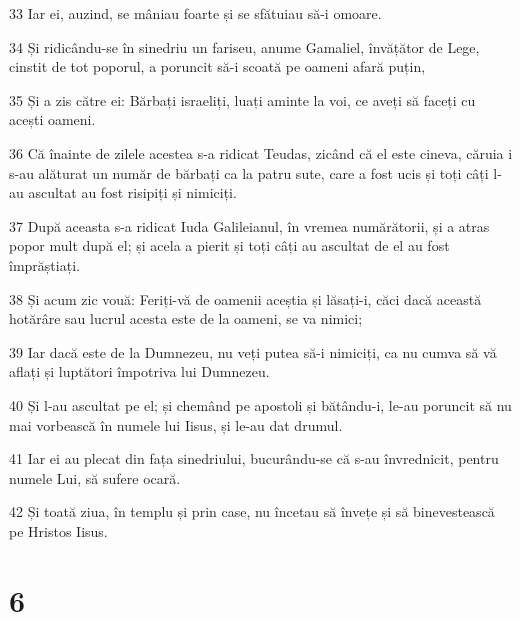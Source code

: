 \par 33 Iar ei, auzind, se mâniau foarte și se sfătuiau să-i omoare.
\par 34 Și ridicându-se în sinedriu un fariseu, anume Gamaliel, învățător de Lege, cinstit de tot poporul, a poruncit să-i scoată pe oameni afară puțin,
\par 35 Și a zis către ei: Bărbați israeliți, luați aminte la voi, ce aveți să faceți cu acești oameni.
\par 36 Că înainte de zilele acestea s-a ridicat Teudas, zicând că el este cineva, căruia i s-au alăturat un număr de bărbați ca la patru sute, care a fost ucis și toți câți l-au ascultat au fost risipiți și nimiciți.
\par 37 După aceasta s-a ridicat Iuda Galileianul, în vremea numărătorii, și a atras popor mult după el; și acela a pierit și toți câți au ascultat de el au fost împrăștiați.
\par 38 Și acum zic vouă: Feriți-vă de oamenii aceștia și lăsați-i, căci dacă această hotărâre sau lucrul acesta este de la oameni, se va nimici;
\par 39 Iar dacă este de la Dumnezeu, nu veți putea să-i nimiciți, ca nu cumva să vă aflați și luptători împotriva lui Dumnezeu.
\par 40 Și l-au ascultat pe el; și chemând pe apostoli și bătându-i, le-au poruncit să nu mai vorbească în numele lui Iisus, și le-au dat drumul.
\par 41 Iar ei au plecat din fața sinedriului, bucurându-se că s-au învrednicit, pentru numele Lui, să sufere ocară.
\par 42 Și toată ziua, în templu și prin case, nu încetau să învețe și să binevestească pe Hristos Iisus.

\chapter{6}

